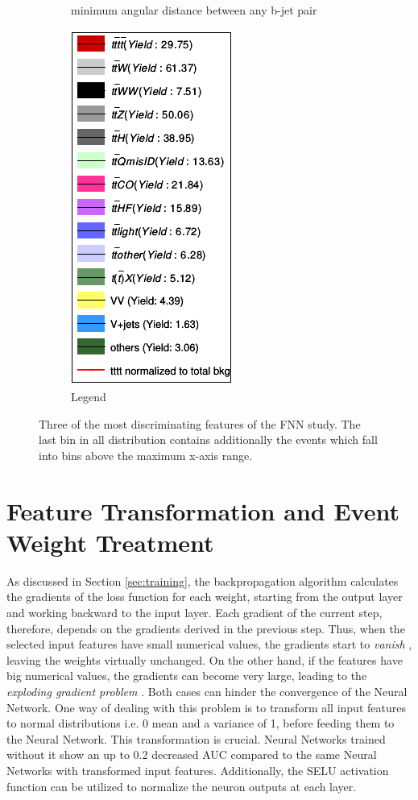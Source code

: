 \begin{figure}[H]
\begin{subfigure}{.5\textwidth}
  \caption{minimum angular distance between any b-jet pair}
  \label{fig:dRbb}
\end{subfigure}%
\begin{subfigure}{.5\textwidth}
  \centering
  \includegraphics[width=.29\linewidth]{figs/features/legende}
  \caption{Legend}
  \label{fig:LegendwY}
\end{subfigure}
\caption{Three of the most discriminating features of the FNN study. The last bin in all distribution contains additionally the events which fall into bins above the maximum x-axis range.}
\label{fig:BestFeatures}
\end{figure}


\section{Feature Transformation and Event Weight Treatment}
\label{sec:transformation}

As discussed in Section \ref{sec:training}, the backpropagation algorithm calculates the gradients of the loss function for each weight, starting from the output layer and working backward to the input layer. Each gradient of the current step, therefore, depends on the gradients derived in the previous step. Thus, when the selected input features have small numerical values, the gradients start to \textit{vanish} \cite{MainNN}, leaving the weights virtually unchanged. On the other hand, if the features have big numerical values, the gradients can become very large, leading to the \textit{exploding gradient problem} \cite{MainNN}. Both cases can hinder the convergence of the Neural Network. One way of dealing with this problem is to transform all input features to normal distributions i.e. 0 mean and a variance of 1, before feeding them to the Neural Network. This transformation is crucial. Neural Networks trained without it show an up to 0.2 decreased AUC compared to the same Neural Networks with transformed input features. Additionally, the SELU activation function can be utilized to normalize the neuron outputs at each layer.\\

